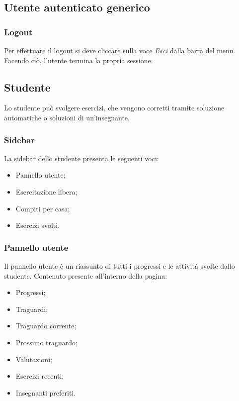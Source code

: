 \subsection{Utente autenticato generico}

    \subsubsection{Logout}
    Per effettuare il {logout} si deve cliccare sulla voce \textit{Esci} dalla barra del menu. Facendo ciò, l'utente termina la propria sessione.

    \subsection{Studente}
      Lo studente può svolgere esercizi, che vengono corretti tramite soluzione automatiche o soluzioni di un'insegnante.
        \subsubsection{Sidebar}
          La sidebar dello studente presenta le seguenti voci:
            \begin{itemize}
                \item Pannello utente;
                \item Esercitazione libera;
                \item Compiti per casa;
                \item Esercizi svolti.
            \end{itemize}
            
            
            
            
            
            
        \subsubsection{Pannello utente}
          Il pannello utente è un riassunto di tutti i progressi e le attività svolte dallo studente.
          Contenuto presente all'interno della pagina:
        	\begin{itemize}
        		\item Progressi;
        		\item Traguardi;
        		\item Traguardo corrente;
        		\item Prossimo traguardo;
        		\item Valutazioni;
        		\item Esercizi recenti;
        		\item Insegnanti preferiti.
        	\end{itemize}
        
